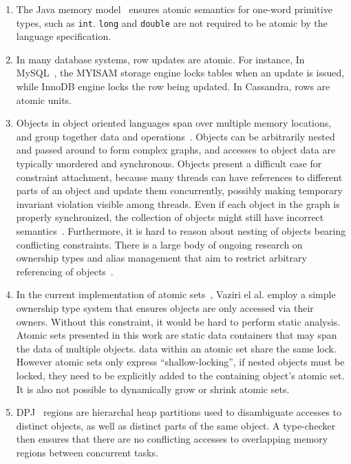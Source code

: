 \documentclass[]{usiinfprospectus}
\begin{document}
\begin{enumerate}
	\itemsep0em 
	\item The Java memory model~\cite{javamemorymodel} ensures atomic semantics for one-word primitive types, such as \texttt{int}. \texttt{long} and \texttt{double} are not required to be atomic by the language specification.  
	\item In many database systems, row updates are atomic. For instance, In MySQL~\cite{mysql}, the MYISAM storage engine locks tables when an update is issued, while InnoDB engine locks the row being updated. In Cassandra, rows are atomic units. 
	\item Objects in object oriented languages span over multiple memory locations, and group together data and operations~\cite{rentsch1982object}. Objects can be arbitrarily nested and passed around to form complex graphs, and accesses to object data are typically unordered and synchronous. Objects present a difficult case for constraint attachment, because many threads can have references to different parts of an object and update them concurrently, possibly making temporary invariant violation visible among threads. Even if each object in the graph is properly synchronized, the collection of objects might still have incorrect semantics~\cite{artho2003high}.  Furthermore, it is hard to reason about nesting of objects bearing conflicting constraints. There is a large body of ongoing research on ownership types and alias management that aim to restrict arbitrary referencing of objects~\cite{muller1999universes, clarke2008minimal, haller2010capabilities}.
	\item In the current implementation of atomic sets~\cite{dolby2012data}, Vaziri el al. employ a simple ownership type system that ensures objects are only accessed via their owners. Without this constraint, it would be hard to perform static analysis. Atomic sets presented in this work are static data containers that may span the data of multiple objects. data within an atomic set share the same lock. However atomic sets only express ``shallow-locking'', if nested objects must be locked, they need to be explicitly added to the containing object's atomic set. It is also not possible to dynamically grow or shrink atomic sets. 
	\item DPJ~\cite{bocchino2009parallel} regions are hierarchal heap partitions used to disambiguate accesses to distinct objects, as well as distinct parts of the same object. A type-checker then ensures that there are no conflicting accesses to overlapping memory regions between concurrent tasks.

\end{enumerate}
\end{document}

